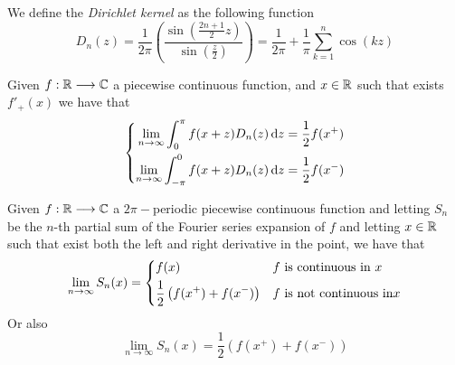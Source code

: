 \documentclass[../complete.tex]{subfiles}
\begin{document}
\begin{dfn}
	We define the \textit{Dirichlet kernel} as the following function
	\begin{equation*}
		D_n(z)=\frac{1}{2\pi}\left( \frac{\sin\left( \frac{2n+1}{2}z \right)}{\sin\left( \frac{z}{2} \right)} \right)=\frac{1}{2\pi}+\frac{1}{\pi}\sum_{k=1}^n\cos(kz)
	\end{equation*}
\end{dfn}
\begin{lem}
	Given $f:\mathbb{R}\overset{}{\longrightarrow}\mathbb{C}$ a piecewise continuous function, and $x\in\mathbb{R}$ such that exists $f'_+(x)$ we have that
	\begin{equation*}
		\left\{ \begin{aligned}
				\lim_{n\to\infty}\int_{0}^{\pi}f(x+z)D_n(z)\operatorname{d\!} z&=\frac{1}{2}f(x^+)\\
				\lim_{n\to\infty}\int_{-\pi}^{0}f(x+z)D_n(z)\operatorname{d\!} z&=\frac{1}{2}f(x^-)
		\end{aligned}\right.
	\end{equation*}
\end{lem}
\begin{thm}
	Given $f:\mathbb{R}\overset{}{\longrightarrow}\mathbb{C}$ a $2\pi-$periodic piecewise continuous function and letting $S_n$ be the $n$-th partial sum of the Fourier series expansion of $f$ and letting $x\in\mathbb{R}$ such that exist both the left and right derivative in the point, we have that
	\begin{equation*}
		\lim_{n\to\infty}S_n(x)=\begin{dcases}f(x)&f\text{ is continuous in }x\\\frac{1}{2}\left( f(x^+)+f(x^-) \right)&f\text{ is not continuous in}x\end{dcases}
	\end{equation*}
	Or also
	\begin{equation*}
		\lim_{n\to\infty}S_n(x)=\frac{1}{2}\left( f(x^+)+f(x^-) \right)
	\end{equation*}
\end{thm}
\end{document}
